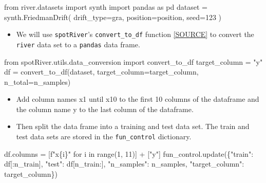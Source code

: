 \documentclass[
  letterpaper,
  DIV=11,
  numbers=noendperiod]{scrreprt}
\newenvironment{Shaded}{\begin{snugshade}}{\end{snugshade}}
\newcommand{\BuiltInTok}[1]{\textcolor[rgb]{0.00,0.23,0.31}{#1}}
\newcommand{\ControlFlowTok}[1]{\textcolor[rgb]{0.00,0.23,0.31}{#1}}
\newcommand{\DecValTok}[1]{\textcolor[rgb]{0.68,0.00,0.00}{#1}}
\newcommand{\ImportTok}[1]{\textcolor[rgb]{0.00,0.46,0.62}{#1}}
\newcommand{\KeywordTok}[1]{\textcolor[rgb]{0.00,0.23,0.31}{#1}}
\newcommand{\NormalTok}[1]{\textcolor[rgb]{0.00,0.23,0.31}{#1}}
\newcommand{\OperatorTok}[1]{\textcolor[rgb]{0.37,0.37,0.37}{#1}}
\newcommand{\SpecialCharTok}[1]{\textcolor[rgb]{0.37,0.37,0.37}{#1}}
\newcommand{\SpecialStringTok}[1]{\textcolor[rgb]{0.13,0.47,0.30}{#1}}
\newcommand{\StringTok}[1]{\textcolor[rgb]{0.13,0.47,0.30}{#1}}
\providecommand{\tightlist}{%
  \setlength{\itemsep}{0pt}\setlength{\parskip}{0pt}}\usepackage{longtable,booktabs,array}
\begin{document}
\begin{Shaded}
\begin{Highlighting}[]
\ImportTok{from}\NormalTok{ river.datasets }\ImportTok{import}\NormalTok{ synth}
\ImportTok{import}\NormalTok{ pandas }\ImportTok{as}\NormalTok{ pd}
\NormalTok{dataset }\OperatorTok{=}\NormalTok{ synth.FriedmanDrift(}
\NormalTok{   drift\_type}\OperatorTok{=}\StringTok{\textquotesingle{}gra\textquotesingle{}}\NormalTok{,}
\NormalTok{   position}\OperatorTok{=}\NormalTok{position,}
\NormalTok{   seed}\OperatorTok{=}\DecValTok{123}
\NormalTok{)}
\end{Highlighting}
\end{Shaded}

\begin{itemize}
\tightlist
\item
  We will use \texttt{spotRiver}'s \texttt{convert\_to\_df} function
  \href{https://github.com/sequential-parameter-optimization/spotRiver/blob/main/src/spotRiver/utils/data_conversion.py}{{[}SOURCE{]}}
  to convert the \texttt{river} data set to a \texttt{pandas} data
  frame.
\end{itemize}

\begin{Shaded}
\begin{Highlighting}[]
\ImportTok{from}\NormalTok{ spotRiver.utils.data\_conversion }\ImportTok{import}\NormalTok{ convert\_to\_df}
\NormalTok{target\_column }\OperatorTok{=} \StringTok{"y"}
\NormalTok{df }\OperatorTok{=}\NormalTok{ convert\_to\_df(dataset, target\_column}\OperatorTok{=}\NormalTok{target\_column, n\_total}\OperatorTok{=}\NormalTok{n\_samples)}
\end{Highlighting}
\end{Shaded}

\begin{itemize}
\tightlist
\item
  Add column names x1 until x10 to the first 10 columns of the dataframe
  and the column name y to the last column of the dataframe.
\item
  Then split the data frame into a training and test data set. The train
  and test data sets are stored in the \texttt{fun\_control} dictionary.
\end{itemize}

\begin{Shaded}
\begin{Highlighting}[]
\NormalTok{df.columns }\OperatorTok{=}\NormalTok{ [}\SpecialStringTok{f"x}\SpecialCharTok{\{}\NormalTok{i}\SpecialCharTok{\}}\SpecialStringTok{"} \ControlFlowTok{for}\NormalTok{ i }\KeywordTok{in} \BuiltInTok{range}\NormalTok{(}\DecValTok{1}\NormalTok{, }\DecValTok{11}\NormalTok{)] }\OperatorTok{+}\NormalTok{ [}\StringTok{"y"}\NormalTok{]}
\NormalTok{fun\_control.update(\{}\StringTok{"train"}\NormalTok{:  df[:n\_train],}
                    \StringTok{"test"}\NormalTok{:  df[n\_train:],}
                    \StringTok{"n\_samples"}\NormalTok{: n\_samples,}
                    \StringTok{"target\_column"}\NormalTok{: target\_column\})}
\end{Highlighting}
\end{Shaded}
\end{document}
